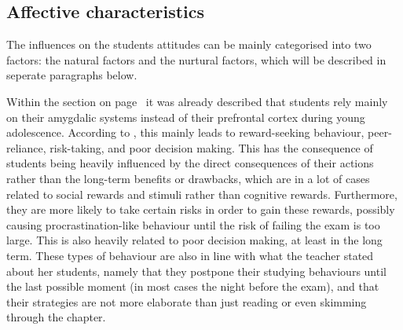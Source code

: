 \subsection{Affective characteristics}

The influences on the students attitudes can be mainly categorised into two factors: the natural factors and the nurtural factors, which will be described in seperate paragraphs below.

Within the section  on page~\pageref{subsec:physiologicalchar} it was already described that students rely mainly on their amygdalic systems instead of their prefrontal cortex during young adolescence. According to , this mainly leads to reward-seeking behaviour, peer-reliance, risk-taking, and poor decision making. This has the consequence of students being heavily influenced by the direct consequences of their actions rather than the long-term benefits or drawbacks, which are in a lot of cases related to social rewards and stimuli rather than cognitive rewards. Furthermore, they are more likely to take certain risks in order to gain these rewards, possibly causing procrastination-like behaviour until the risk of failing the exam is too large. This is also heavily related to poor decision making, at least in the long term. These types of behaviour are also in line with what the teacher stated about her students, namely that they postpone their studying behaviours until the last possible moment (in most cases the night before the exam), and that their strategies are not more elaborate than just reading or even skimming through the chapter.


